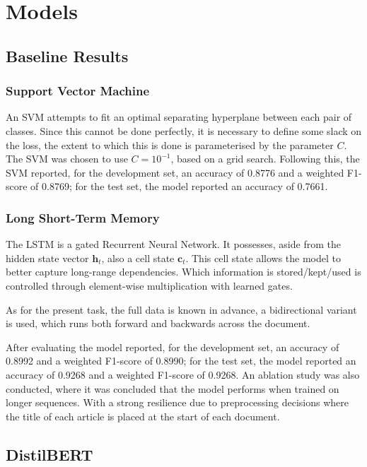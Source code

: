 \documentclass[12pt,a4paper,english]{article}
\begin{document}
\section{Models}
\subsection{Baseline Results}
\subsubsection{Support Vector Machine}
An SVM attempts to fit an optimal separating hyperplane between each pair of classes. Since this cannot be done perfectly, it is necessary to define some slack on the loss, the extent to which this is done is parameterised by the parameter $C$.
The SVM was chosen to use $C=10^{-1}$, based on a grid search. Following this, the SVM reported, for the development set, an accuracy of 0.8776
and a weighted F1-score of 0.8769; for the test set, the model reported an accuracy of 0.7661. 

\subsubsection{Long Short-Term Memory}
The LSTM is a gated Recurrent Neural Network. It possesses, aside from the hidden state vector $\boldsymbol{h}_t$, also a cell state $\boldsymbol{c}_t$. This cell state allows the model to better capture long-range dependencies. Which information is stored/kept/used is controlled through element-wise multiplication with learned gates. 

As for the present task, the full data is known in advance, a bidirectional variant is used, which runs both forward and backwards across the document. 

After evaluating the model reported, for the development set, an accuracy of 0.8992 and a weighted
F1-score of 0.8990; for the test set, the model reported an accuracy of 0.9268 and a weighted
F1-score of 0.9268. An ablation study was also conducted, where it was concluded that the model performs when trained on longer sequences. With a strong resilience due to preprocessing decisions where the title of each article is placed at the start of each document. 

\subsection{DistilBERT}
\end{document}
